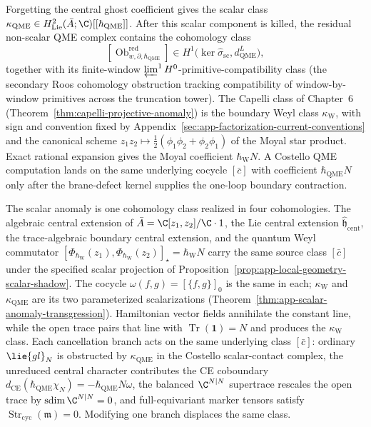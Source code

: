 Forgetting the central ghost coefficient gives the scalar class
\(\kappa_{\mathrm{QME}}\in
H^2_{\mathrm{Lie}}(\bar A;\C)[[\hbar_{\mathrm{QME}}]]\).
After this scalar component is killed, the residual non-scalar QME
complex contains the cohomology class
\[
  [\operatorname{Ob}^{\mathrm{red}}_{w,\partial,\hbar_{\mathrm{QME}}}]
  \in
  H^1\!\bigl(\ker\widehat\sigma_{\mathrm{sc}},
    d_{\mathrm{QME}}^{L}\bigr),
\]
together with its finite-window
\(\varprojlim^1H^0\)-primitive-compatibility class
(the secondary Roos cohomology obstruction tracking compatibility of
window-by-window primitives across the truncation tower).  The
Capelli class of Chapter~6
(Theorem~\ref{thm:capelli-projective-anomaly}) is the boundary Weyl
class \(\kappa_{\mathrm{W}}\), with sign and convention fixed by
Appendix~\ref{sec:app-factorization-current-conventions} and the canonical scheme
\(z_1z_2\mapsto\tfrac12(\phi_1\phi_2+\phi_2\phi_1)\) of the Moyal
star product.  Exact rational expansion gives the Moyal coefficient
\(\hbar_{\mathrm{W}}N\).  A Costello QME computation lands on the same
underlying cocycle \([\bar c]\) with coefficient \(\hbar_{\mathrm{QME}}N\)
only after the brane-defect kernel supplies the one-loop boundary
contraction.

The scalar anomaly is one cohomology class realized in four
cohomologies.  The algebraic central extension of
\(\bar A=\C[z_1,z_2]/\C\cdot1\), the Lie central extension
\(\widehat{\mathfrak h}_{\mathrm{cent}}\), the trace-algebraic
boundary central extension, and the quantum Weyl commutator
\([\Phi_{\hbar_{\mathrm{W}}}(z_1),
  \Phi_{\hbar_{\mathrm{W}}}(z_2)]_\star=\hbar_{\mathrm{W}}N\)
carry the same source class \([\bar c]\) under the specified scalar
projection of Proposition~\ref{prop:app-local-geometry-scalar-shadow}.
The cocycle \(\omega(f,g)=[\{f,g\}]_0\) is the same in
each; \(\kappa_{\mathrm{W}}\) and \(\kappa_{\mathrm{QME}}\) are its two
parameterized scalarizations
(Theorem~\ref{thm:app-scalar-anomaly-transgression}).  Hamiltonian
vector fields annihilate the constant line, while the open trace pairs
that line with \(\operatorname{Tr}(\mathbf 1)=N\) and produces the
\(\kappa_{\mathrm{W}}\) class.  Each cancellation branch acts on the
same underlying class \([\bar c]\): ordinary \(\lie{gl}_N\) is obstructed by
\(\kappa_{\mathrm{QME}}\) in the Costello scalar-contact complex, the
unreduced central character contributes the
CE coboundary
\(d_{\mathrm{CE}}(\hbar_{\mathrm{QME}}\chi_N)
  =-\hbar_{\mathrm{QME}}N\omega\), the
balanced \(\C^{N|N}\) supertrace rescales the open trace by
\(\operatorname{sdim}\C^{N|N}=0\), and full-equivariant marker
tensors satisfy
\(\operatorname{Str}_{\mathrm{cyc}}(\mathfrak m)=0\).  Modifying one
branch displaces the same class.


